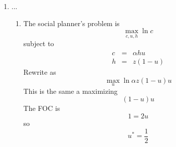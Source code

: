 \documentclass{article}
\begin{document}
\begin{enumerate}
\begin{enumerate}
\item Under the subsidy scheme, the budget constraint in%
\begin{equation*}
c=\omega n\left( 1-\tau \right) +\varsigma 
\end{equation*}%
\begin{equation*}
U\left( c,\ell ,\bar{\ell}\right) =\ln \left[ \omega \left( 1-\ell \right)
\left( 1-\tau \right) +\varsigma \right] +\ln \ell +\ln \bar{\ell}
\end{equation*}%
\begin{equation*}
\frac{\omega \left( 1-\tau \right) }{\omega \left( 1-\ell \right) \left(
1-\tau \right) +\varsigma }=\frac{1}{\ell }
\end{equation*}%
Government budget constraint is $\omega \left( 1-\ell \right) \tau
=\varsigma .$ Wage is $\omega =\alpha \left( 1-\ell \right) ^{\alpha -1}\ $%
giving%
\begin{equation*}
\frac{\omega \left( 1-\tau \right) }{\omega \left( 1-\ell \right) \left(
1-\tau \right) +\omega \left( 1-\ell \right) \tau }=\frac{1}{\ell }
\end{equation*}%
\begin{equation*}
\frac{1-\tau }{1-\ell }=\frac{1}{\ell }
\end{equation*}%
\begin{equation*}
\ell =\frac{1}{2-\tau }
\end{equation*}

\item Set $\tau $ to make these equal. 
\begin{equation*}
\frac{2}{\alpha +2}=\frac{1}{1-\tau +1}
\end{equation*}%
\begin{equation*}
\frac{2}{\alpha +2}=\frac{1}{2-\tau }
\end{equation*}%
\begin{equation*}
\tau =1-\frac{1}{2}\alpha 
\end{equation*}
\end{enumerate}

\item ...

\begin{enumerate}
\item The social planner's problem is 
\begin{equation*}
\underset{c,u,h}{\max }\ln c
\end{equation*}%
subject to 
\begin{eqnarray*}
c &=&\alpha hu \\
h &=&z(1-u)
\end{eqnarray*}%
Rewrite as%
\begin{equation*}
\underset{u}{\max }\ln \alpha z(1-u)u
\end{equation*}%
This is the same a maximizing%
\begin{equation*}
(1-u)u
\end{equation*}%
The FOC is 
\begin{equation*}
1=2u
\end{equation*}%
so%
\begin{equation*}
u^{\ast }=\frac{1}{2}
\end{equation*}


\end{enumerate}
\end{enumerate}
\end{document}
